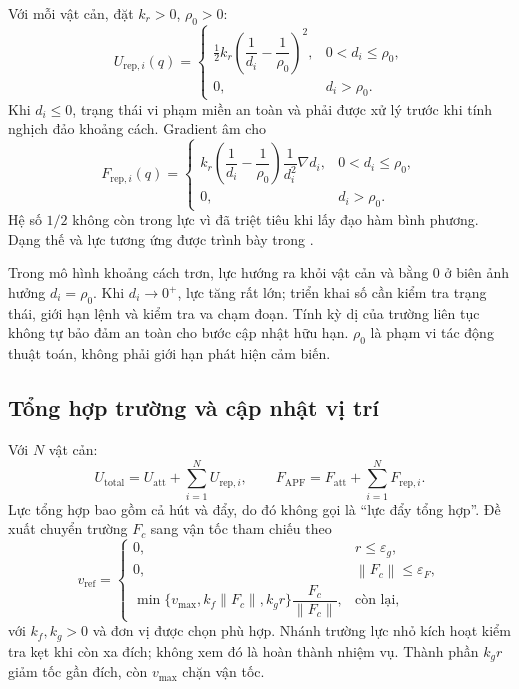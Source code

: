 \documentclass[12pt,a4paper,oneside]{report}
\numberwithin{equation}{chapter}
\newcommand{\norm}[1]{\left\lVert #1\right\rVert}
\newcommand{\att}{\mathrm{att}}
\newcommand{\rep}{\mathrm{rep}}
\begin{document}
Với mỗi vật cản, đặt $k_r>0$, $\rho_0>0$:
\begin{equation}
U_{\rep,i}(q)=\begin{cases}
\frac12 k_r\left(\dfrac1{d_i}-\dfrac1{\rho_0}\right)^2,&0<d_i\le\rho_0,\\
0,&d_i>\rho_0.
\end{cases}
\end{equation}
Khi $d_i\le0$, trạng thái vi phạm miền an toàn và phải được xử lý trước khi tính nghịch đảo khoảng cách. Gradient âm cho
\begin{equation}
F_{\rep,i}(q)=\begin{cases}
k_r\left(\dfrac1{d_i}-\dfrac1{\rho_0}\right)\dfrac1{d_i^2}\nabla d_i,&0<d_i\le\rho_0,\\
0,&d_i>\rho_0.
\end{cases}
\label{eq:repulsive}
\end{equation}
Hệ số $1/2$ không còn trong lực vì đã triệt tiêu khi lấy đạo hàm bình phương. Dạng thế và lực tương ứng được trình bày trong \cite{gecui}.

Trong mô hình khoảng cách trơn, lực hướng ra khỏi vật cản và bằng 0 ở biên ảnh hưởng $d_i=\rho_0$. Khi $d_i\to0^+$, lực tăng rất lớn; triển khai số cần kiểm tra trạng thái, giới hạn lệnh và kiểm tra va chạm đoạn. Tính kỳ dị của trường liên tục không tự bảo đảm an toàn cho bước cập nhật hữu hạn. $\rho_0$ là phạm vi tác động thuật toán, không phải giới hạn phát hiện cảm biến.

\subsection{Tổng hợp trường và cập nhật vị trí}

Với $N$ vật cản:
\begin{equation}
U_{\mathrm{total}}=U_{\att}+\sum_{i=1}^N U_{\rep,i},\qquad
F_{\mathrm{APF}}=F_{\att}+\sum_{i=1}^N F_{\rep,i}.
\end{equation}
Lực tổng hợp bao gồm cả hút và đẩy, do đó không gọi là ``lực đẩy tổng hợp''. Đề xuất chuyển trường $F_c$ sang vận tốc tham chiếu theo
\begin{equation}
v_{\mathrm{ref}}=\begin{cases}
0,&r\le\varepsilon_g,\\
0,&\norm{F_c}\le\varepsilon_F,\\
\min\{v_{\max},k_f\norm{F_c},k_g r\}\dfrac{F_c}{\norm{F_c}},&\text{còn lại},
\end{cases}
\label{eq:velocity}
\end{equation}
với $k_f,k_g>0$ và đơn vị được chọn phù hợp. Nhánh trường lực nhỏ kích hoạt kiểm tra kẹt khi còn xa đích; không xem đó là hoàn thành nhiệm vụ. Thành phần $k_g r$ giảm tốc gần đích, còn $v_{\max}$ chặn vận tốc.
\end{document}
